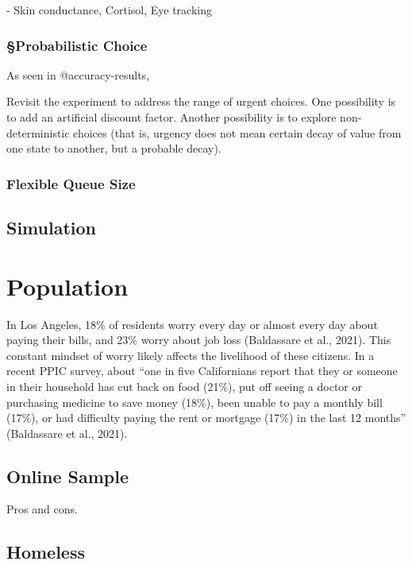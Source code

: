 \documentclass[
]{report}
\begin{document}
- Skin conductance, Cortisol, Eye tracking

\hypertarget{probabilistic-choice}{%
\subsubsection{§Probabilistic Choice}\label{probabilistic-choice}}

As seen in @accuracy-results,

Revisit the experiment to address the range of urgent choices. One
possibility is to add an artificial discount factor. Another possibility
is to explore non-deterministic choices (that is, urgency does not mean
certain decay of value from one state to another, but a probable decay).

\hypertarget{flexible-queue-size}{%
\subsubsection{Flexible Queue Size}\label{flexible-queue-size}}

\hypertarget{simulation-2}{%
\subsection{Simulation}\label{simulation-2}}

\hypertarget{population}{%
\section{Population}\label{population}}

In Los Angeles, 18\% of residents worry every day or almost every day
about paying their bills, and 23\% worry about job loss (Baldassare et
al., 2021). This constant mindset of worry likely affects the livelihood
of these citizens. In a recent PPIC survey, about ``one in five
Californians report that they or someone in their household has cut back
on food (21\%), put off seeing a doctor or purchasing medicine to save
money (18\%), been unable to pay a monthly bill (17\%), or had
difficulty paying the rent or mortgage (17\%) in the last 12 months''
(Baldassare et al., 2021).

\hypertarget{online-sample}{%
\subsection{Online Sample}\label{online-sample}}

Pros and cons.

\hypertarget{homeless}{%
\subsection{Homeless}\label{homeless}}
\end{document}
